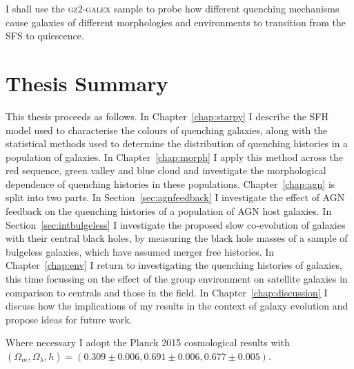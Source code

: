 I shall use the \textsc{gz2-galex} sample to probe how different quenching mechanisms cause galaxies of different morphologies and environments to transition from the SFS to quiescence. 


\section{Thesis Summary}\label{sec:thesissum}


This thesis proceeds as follows. In Chapter~\ref{chap:starpy} I describe the SFH model used to characterise the colours of quenching galaxies, along with the statistical methods used to determine the distribution of quenching histories in a population of galaxies. In Chapter~\ref{chap:morph} I apply this method across the red sequence, green valley and blue cloud and investigate the morphological dependence of quenching histories in these populations. Chapter~\ref{chap:agn} is split into two parts. In Section~\ref{sec:agnfeedback} I investigate the effect of AGN feedback on the quenching histories of a  population of AGN host galaxies. In Section~\ref{sec:intbulgeless} I investigate the proposed slow co-evolution of galaxies with their central black holes, by measuring the black hole masses of a sample of bulgeless galaxies, which have assumed merger free histories. In Chapter~\ref{chap:env} I return to investigating the quenching histories of galaxies, this time focussing on the effect of the group environment on satellite galaxies in comparison to centrals and those in the field. In Chapter~\ref{chap:discussion} I discuss how the implications of my results in the context of galaxy evolution and propose ideas for future work.

Where necessary I adopt the Planck 2015 cosmological results \citep{planck16} with $(\Omega_m, \Omega_{\lambda}, h) = (0.309 \pm 0.006, 0.691 \pm 0.006, 0.677 \pm 0.005)$. 
